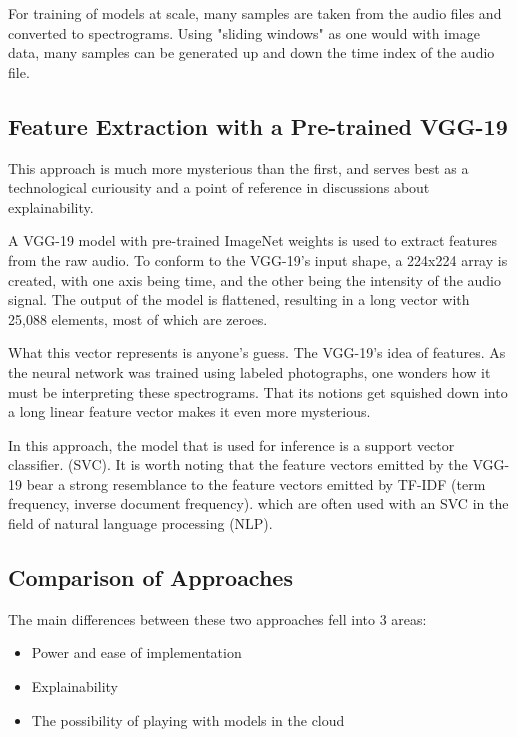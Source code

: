 \documentclass[sigconf]{acmart}
\begin{document}
For training of models at scale, many samples are taken from the audio files
and converted to spectrograms. Using "sliding windows" as one would with image data,
many samples can be generated up and down the time index of the audio file.

\subsection{Feature Extraction with a Pre-trained VGG-19}

This approach is much more mysterious than the first, and serves best
as a technological curiousity and a point of reference in discussions about
explainability.

A VGG-19 model with pre-trained ImageNet weights is used to extract
features from the raw audio. \cite{mahmood20} To conform to the VGG-19's
input shape, a 224x224 array is created, with one axis being time, and the
other being the intensity of the audio signal. The output of the model
is flattened, resulting in a long vector with 25,088 elements, most of which
are zeroes.

What this vector represents is anyone's guess. The VGG-19's idea of features.
As the neural network was trained using labeled photographs, one wonders
how it must be interpreting these spectrograms. That its notions get squished 
down into a long linear feature vector makes it even more mysterious.

In this approach, the model that is used for inference is a support vector
classifier. (SVC). It is worth noting that the feature vectors emitted by the
VGG-19 bear a strong resemblance to the feature vectors emitted by 
TF-IDF (term frequency, inverse document frequency). which are often used 
with an SVC in the field of natural
language processing (NLP).

\subsection{Comparison of Approaches}

The main differences between these two approaches fell into 3 areas:

\begin{itemize}
\item Power and ease of implementation
\item Explainability
\item The possibility of playing with models in the cloud
\end{itemize}
\end{document}
